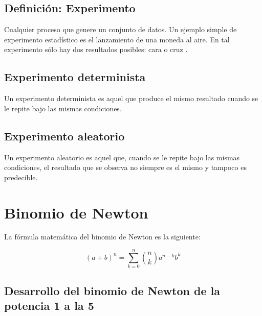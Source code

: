 \documentclass{article}
\begin{document}
\subsection{Definici\'on: Experimento}

Cualquier proceso que genere un conjunto de datos. Un ejemplo simple de
experimento estad\'istico es el lanzamiento de una moneda al aire. En tal
experimento s\'olo hay dos resultados posibles: cara o cruz
\cite{walpole2012probabilidad}.

\subsection{Experimento determinista}
Un experimento determinista es aquel que produce el mismo resultado cuando se le
repite bajo las mismas condiciones.

\subsection{Experimento aleatorio}
Un experimento aleatorio es aquel que, cuando se le repite bajo las mismas
condiciones, el resultado que se observa no siempre es el mismo y tampoco es
predecible.

\section{Binomio de Newton}

La fórmula matemática del binomio de Newton es la siguiente:

\begin{equation}
    (a+b)^n = \sum_{k=0}^{n} \binom{n}{k} a^{n-k} b^k
\end{equation}

\subsection{Desarrollo del binomio de Newton de la potencia 1 a la 5}
\end{document}
